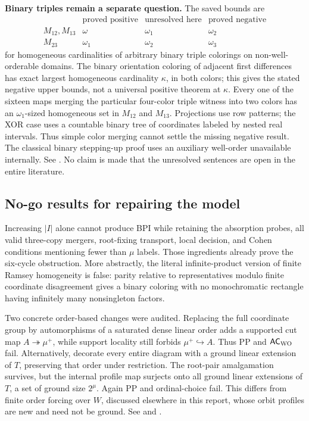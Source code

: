 \textbf{Binary triples remain a separate question.}
The saved bounds are
\[
\begin{array}{c|ccc}
 &\text{proved positive}&\text{unresolved here}&\text{proved negative}\\\hline
 M_{12},M_{13}&\omega&\omega_1&\omega_2\\
 M_{23}&\omega_1&\omega_2&\omega_3
\end{array}
\]
for homogeneous cardinalities of arbitrary binary triple colorings on
non-well-orderable domains. The binary orientation coloring of adjacent
first differences has exact largest homogeneous cardinality $\kappa$,
in both colors; this gives the stated negative upper bounds, not a
universal positive theorem at $\kappa$. Every one of the sixteen maps
merging the particular four-color triple witness into two colors has
an $\omega_1$-sized homogeneous set in $M_{12}$ and $M_{13}$. Projections
use row patterns; the XOR case uses a countable binary tree of
coordinates labeled by nested real intervals. Thus simple color merging
cannot settle the missing negative result. The classical binary
stepping-up proof uses an auxiliary well-order unavailable internally.
See . No claim is made
that the unresolved sentences are open in the entire literature.

\subsection{No-go results for repairing the model}

Increasing $|I|$ alone cannot produce BPI while retaining the absorption
probes, all valid three-copy mergers, root-fixing transport, local
decision, and Cohen conditions mentioning fewer than $\mu$ labels.
Those ingredients already prove the six-cycle obstruction. More
abstractly, the literal infinite-product version of finite Ramsey
homogeneity is false: parity relative to representatives modulo finite
coordinate disagreement gives a binary coloring with no monochromatic
rectangle having infinitely many nonsingleton factors.

Two concrete order-based changes were audited. Replacing the full
coordinate group by automorphisms of a saturated dense linear order
adds a supported cut map $A\twoheadrightarrow\mu^+$, while support
locality still forbids $\mu^+\hookrightarrow A$. Thus PP and
$\mathsf{AC}_{\rm WO}$ fail. Alternatively, decorate every entire
diagram with a ground linear extension of $T$, preserving that order
under restriction. The root-pair amalgamation survives, but the
internal profile map surjects onto all ground linear extensions of
$T$, a set of ground size $2^\mu$. Again PP and ordinal-choice fail.
This differs from finite order forcing over $W$, discussed elsewhere
in this report, whose orbit profiles are new and need not be ground.
See  and
.


